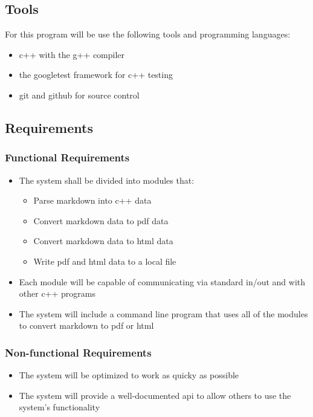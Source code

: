 \subsection{Tools}
For this program will be use the following tools and programming languages:
\begin{itemize}
	\item c++ with the g++ compiler
	\item the googletest framework for c++ testing
	\item git and github for source control
\end{itemize}

\subsection{Requirements}

\subsubsection{Functional Requirements}

\begin{itemize}
	\item The system shall be divided into modules that:
		\begin{itemize}
			\item Parse markdown into c++ data
			\item Convert markdown data to pdf data
			\item Convert markdown data to html data
			\item Write pdf and html data to a local file
		\end{itemize}
	\item Each module will be capable of communicating via standard in/out and with other c++ programs
	\item The system will include a command line program that uses all of the modules to convert markdown to pdf or html
\end{itemize}

\subsubsection{Non-functional Requirements}
\begin{itemize}
	\item The system will be optimized to work as quicky as possible
	\item The system will provide a well-documented api to allow others to use the system's functionality
\end{itemize}

